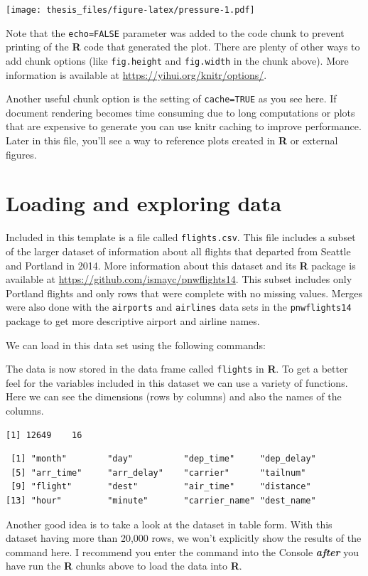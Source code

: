 \documentclass[12pt,twoside]{reedthesis}
\begin{document}
\texttt{[image: thesis\_files/figure-latex/pressure-1.pdf]}

Note that the \texttt{echo=FALSE} parameter was added to the code chunk to prevent printing of the \textbf{R} code that generated the plot. There are plenty of other ways to add chunk options (like \texttt{fig.height} and \texttt{fig.width} in the chunk above). More information is available at \url{https://yihui.org/knitr/options/}.

Another useful chunk option is the setting of \texttt{cache=TRUE} as you see here. If document rendering becomes time consuming due to long computations or plots that are expensive to generate you can use knitr caching to improve performance. Later in this file, you'll see a way to reference plots created in \textbf{R} or external figures.

\hypertarget{loading-and-exploring-data}{%
\section{Loading and exploring data}\label{loading-and-exploring-data}}

Included in this template is a file called \texttt{flights.csv}. This file includes a subset of the larger dataset of information about all flights that departed from Seattle and Portland in 2014. More information about this dataset and its \textbf{R} package is available at \url{https://github.com/ismayc/pnwflights14}. This subset includes only Portland flights and only rows that were complete with no missing values. Merges were also done with the \texttt{airports} and \texttt{airlines} data sets in the \texttt{pnwflights14} package to get more descriptive airport and airline names.

We can load in this data set using the following commands:

The data is now stored in the data frame called \texttt{flights} in \textbf{R}. To get a better feel for the variables included in this dataset we can use a variety of functions. Here we can see the dimensions (rows by columns) and also the names of the columns.
\begin{verbatim}
[1] 12649    16
\end{verbatim}
\begin{verbatim}
 [1] "month"        "day"          "dep_time"     "dep_delay"   
 [5] "arr_time"     "arr_delay"    "carrier"      "tailnum"     
 [9] "flight"       "dest"         "air_time"     "distance"    
[13] "hour"         "minute"       "carrier_name" "dest_name"   
\end{verbatim}
Another good idea is to take a look at the dataset in table form. With this dataset having more than 20,000 rows, we won't explicitly show the results of the command here. I recommend you enter the command into the Console \textbf{\emph{after}} you have run the \textbf{R} chunks above to load the data into \textbf{R}.
\end{document}
